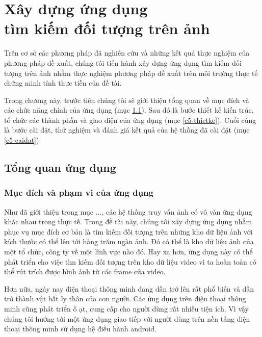 \chapter[Xây dựng ứng dụng\\tìm kiếm đối tượng trên ảnh]{Xây dựng ứng dụng\\tìm kiếm đối tượng trên ảnh}
\label{chapter:application}
\ifpdf
    \graphicspath{{Chapter5/Chapter5Figs/PNG/}{Chapter5/Chapter5Figs/PDF/}{Chapter5/Chapter5Figs/}}
\else
    \graphicspath{{Chapter5/Chapter5Figs/EPS/}{Chapter5/Chapter5Figs/}}
\fi
{}

Trên cơ sở các phương pháp đã nghiên cứu và những kết quả thực nghiệm của phương pháp đề xuất, chúng tôi tiến hành xây dựng ứng dụng tìm kiếm đối tượng trên ảnh nhằm thực nghiệm phương pháp đề xuất trên môi trường thực tế chứng minh tính thực tiễn của đề tài.

Trong chương này, trước tiên chúng tôi sẽ giới thiệu tổng quan về mục đích và các chức năng chính của ứng dụng (mục \ref{c5-tongquan}). Sau đó là bước thiết kế kiến trúc, tổ chức các thành phần và giao diện của ứng dụng (mục \ref{c5-thietke}). Cuối cùng là bước cài đặt, thử nghiệm và đánh giá kết quả của hệ thống đã cài đặt (mục \ref{c5-caidat}).

\section{Tổng quan ứng dụng}
\label{c5-tongquan}

	\subsection{Mục đích và phạm vi của ứng dụng}
Như đã giới thiệu trong mục ..., các hệ thống truy vấn ảnh có vô vàn ứng dụng khác nhau trong thực tế. Trong đề tài này, chúng tôi xây dựng ứng dụng nhằm phục vụ mục đích cơ bản là tìm kiếm đối tượng trên những kho dữ liệu ảnh với kích thước có thể lên tới hàng trăm ngàn ảnh. Đó có thể là kho dữ liệu ảnh của một tổ chức, công ty về một lĩnh vực nào đó. Hay xa hơn, ứng dụng này có thể phát triển cho việc tìm kiếm đối tượng trên kho dữ liệu video vì ta hoàn toàn có thể rút trích được hình ảnh từ các frame của video.

Hơn nữa, ngày nay điện thoại thông minh đang dần trở lên rất phổ biến và dần trở thành vật bất ly thân của con người. Các ứng dụng trên điện thoại thông minh cũng phát triển ồ ạt, cung cấp cho người dùng rất nhiều tiện ích. Vì vậy chúng tôi hướng tới một ứng dụng giao tiếp với người dùng trên nền tảng điện thoại thông minh sử dụng hệ điều hành android.
	
